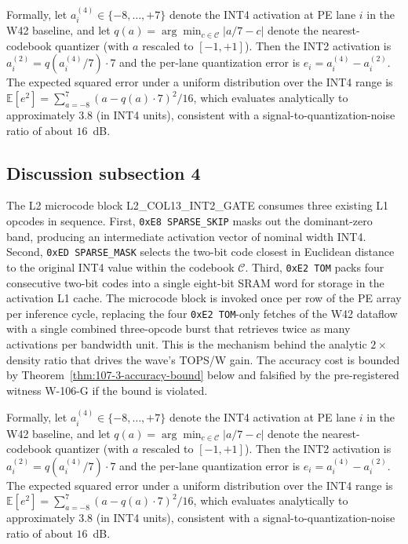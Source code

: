 Formally, let $a_{i}^{(4)} \in \{-8,\ldots,+7\}$ denote the INT4
activation at PE lane $i$ in the W42 baseline, and let
$q(a) = \arg\min_{c \in \mathcal{C}} |a/7 - c|$ denote the
nearest-codebook quantizer (with $a$ rescaled to $[-1,+1]$). Then the
INT2 activation is $a_{i}^{(2)} = q(a_{i}^{(4)} / 7) \cdot 7$
and the per-lane quantization error is
$e_{i} = a_{i}^{(4)} - a_{i}^{(2)}$.
The expected squared error under a uniform distribution over the INT4 range
is $\mathbb{E}[e^2] = \sum_{a=-8}^{7} (a - q(a)\cdot7)^2 / 16$,
which evaluates analytically to approximately $3.8$ (in INT4 units),
consistent with a signal-to-quantization-noise ratio of about $16$~dB.


\subsection{Discussion subsection 4}

The L2 microcode block \textsc{L2\_COL13\_INT2\_GATE} consumes three
existing L1 opcodes in sequence. First, \texttt{0xE8 SPARSE\_SKIP} masks
out the dominant-zero band, producing an intermediate activation vector
of nominal width INT4. Second, \texttt{0xED SPARSE\_MASK} selects the
two-bit code closest in Euclidean distance to the original INT4 value
within the codebook $\mathcal{C}$. Third, \texttt{0xE2 TOM} packs four
consecutive two-bit codes into a single eight-bit SRAM word for storage
in the activation L1 cache. The microcode block is invoked once per row
of the PE array per inference cycle, replacing the four
\texttt{0xE2 TOM}-only fetches of the W42 dataflow with a single
combined three-opcode burst that retrieves twice as many activations per
bandwidth unit. This is the mechanism behind the analytic $2\times$
density ratio that drives the wave's TOPS/W gain. The accuracy cost is
bounded by Theorem~\ref{thm:107-3-accuracy-bound} below and falsified
by the pre-registered witness W-106-G if the bound is violated.

Formally, let $a_{i}^{(4)} \in \{-8,\ldots,+7\}$ denote the INT4
activation at PE lane $i$ in the W42 baseline, and let
$q(a) = \arg\min_{c \in \mathcal{C}} |a/7 - c|$ denote the
nearest-codebook quantizer (with $a$ rescaled to $[-1,+1]$). Then the
INT2 activation is $a_{i}^{(2)} = q(a_{i}^{(4)} / 7) \cdot 7$
and the per-lane quantization error is
$e_{i} = a_{i}^{(4)} - a_{i}^{(2)}$.
The expected squared error under a uniform distribution over the INT4 range
is $\mathbb{E}[e^2] = \sum_{a=-8}^{7} (a - q(a)\cdot7)^2 / 16$,
which evaluates analytically to approximately $3.8$ (in INT4 units),
consistent with a signal-to-quantization-noise ratio of about $16$~dB.


